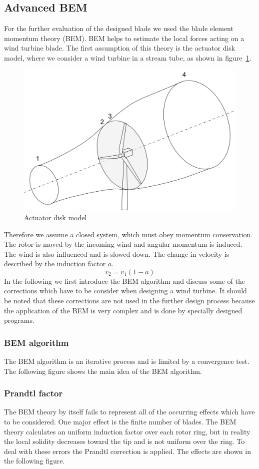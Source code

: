 \documentclass[10pt]{article}
\begin{document}
\subsection{Advanced BEM}
For the further evaluation of the designed blade we used the blade element momentum theory (BEM). BEM helps to estimate the local forces acting on a wind turbine blade. The first assumption of this theory is the actuator disk model, where we consider a wind turbine in a stream tube, as shown in figure~\ref{fig:actuatordisk}.
\begin{figure}[H]
\centering
\includegraphics[width=0.6\linewidth]{../CIP_2/Figures/actuatordiskb.png}
\caption{Actuator disk model}
\label{fig:actuatordisk}
\end{figure}
Therefore we assume a closed system, which must obey momentum conservation. The rotor is moved by the incoming wind and angular momentum is induced. The wind is also influenced and is slowed down. The change in velocity is described by the induction factor $a$.
\begin{equation}
v_2 = v_1(1-a)
\end{equation}
In the following we first introduce the BEM algorithm and discuss some of the corrections which have to be consider when designing a wind turbine. It should be noted that these corrections are not used in the further design process because the application of the BEM is very complex and is done by specially designed programs.
\subsubsection{BEM algorithm}
The BEM algorithm is an iterative process and is limited by a convergence test. The following figure shows the main idea of the BEM algorithm.
\subsubsection{Prandtl factor}
The BEM theory by itself fails to represent all of the occurring effects which have to be considered. One major effect is the finite number of blades. The BEM theory calculates an uniform induction factor over each rotor ring, but in reality the local solidity decreases toward the tip and is not uniform over the ring. To deal with these errors the Prandtl correction is applied. The effects are shown in the following figure.
\end{document}
